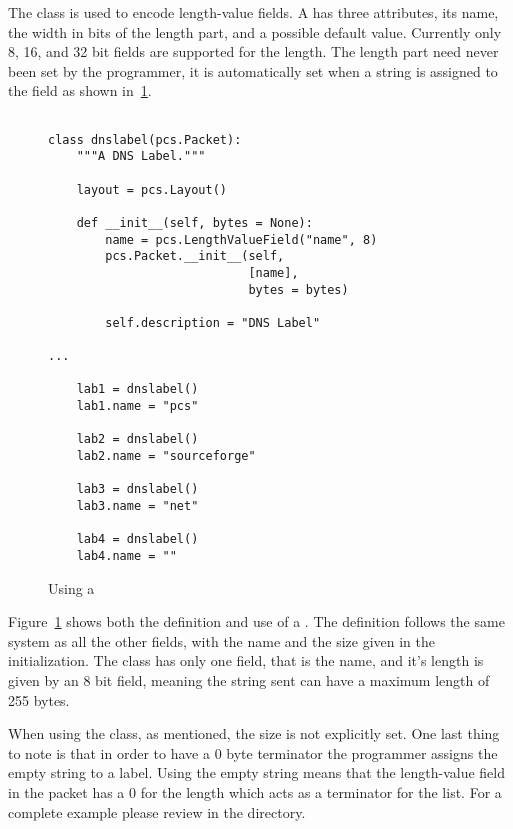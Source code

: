 \documentclass[11pt]{article}
\begin{document}
The  class is used to encode length-value
fields.  A  has three attributes, its name,
the width in bits of the length part, and a possible default value.
Currently only 8, 16, and 32 bit fields are supported for the length.
The length part need never been set by the programmer, it is
automatically set when a string is assigned to the field as shown
in~\ref{fig:using-a-length-value-field}.

\begin{figure}
  \centering
\begin{verbatim}

class dnslabel(pcs.Packet):
    """A DNS Label.""" 

    layout = pcs.Layout()

    def __init__(self, bytes = None):
        name = pcs.LengthValueField("name", 8)
        pcs.Packet.__init__(self,
                            [name],
                            bytes = bytes)
        
        self.description = "DNS Label"

...

    lab1 = dnslabel()
    lab1.name = "pcs"

    lab2 = dnslabel()
    lab2.name = "sourceforge"

    lab3 = dnslabel()
    lab3.name = "net"

    lab4 = dnslabel()
    lab4.name = ""

\end{verbatim}
  \caption{Using a }
  \label{fig:using-a-length-value-field}
\end{figure}

Figure~\ref{fig:using-a-length-value-field} shows both the definition
and use of a .  The definition follows the
same system as all the other fields, with the name and the size given
in the initialization.  The  class has only one field,
that is the name, and it's length is given by an 8 bit field, meaning
the string sent can have a maximum length of 255 bytes.  

When using the class, as mentioned, the size is not explicitly set.
One last thing to note is that in order to have a 0 byte terminator
the programmer assigns the empty string to a label.  Using the empty
string means that the length-value field in the packet has a 0 for the
length which acts as a terminator for the list.  For a complete
example please review  in the 
directory.
\end{document}
